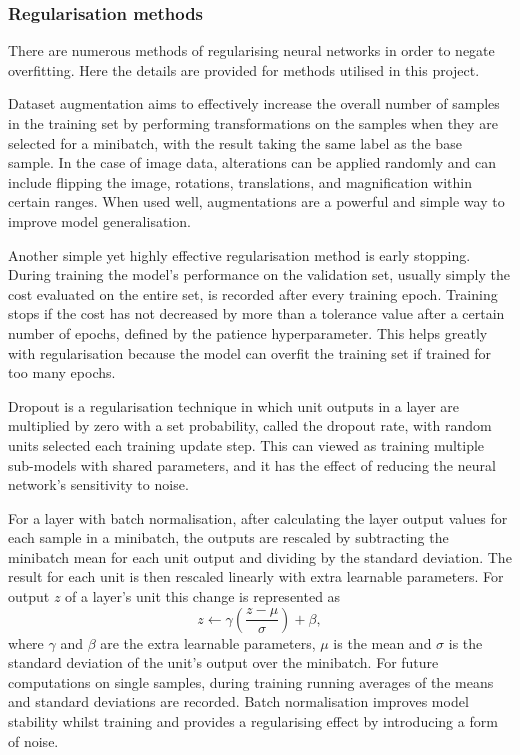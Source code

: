 \documentclass[12pt]{article}
\begin{document}
\subsubsection{Regularisation methods}
There are numerous methods of regularising neural networks in order to negate overfitting. Here the details are provided for methods utilised in this project.

Dataset augmentation aims to effectively increase the overall number of samples in the training set by performing transformations on the samples when they are selected for a minibatch, with the result taking the same label as the base sample. In the case of image data, alterations can be applied randomly and can include flipping the image, rotations, translations, and magnification within certain ranges. When used well, augmentations are a powerful and simple way to improve model generalisation.

Another simple yet highly effective regularisation method is early stopping. During training the model's performance on the validation set, usually simply the cost evaluated on the entire set, is recorded after every training epoch. Training stops if the cost has not decreased by more than a tolerance value after a certain number of epochs, defined by the patience hyperparameter. This helps greatly with regularisation because the model can overfit the training set if trained for too many epochs.

Dropout is a regularisation technique in which unit outputs in a layer are multiplied by zero with a set probability, called the dropout rate, with random units selected each training update step. This can viewed as training multiple sub-models with shared parameters, and it has the effect of reducing the neural network's sensitivity to noise.

For a layer with batch normalisation, after calculating the layer output values for each sample in a minibatch, the outputs are rescaled by subtracting the minibatch mean for each unit output and dividing by the standard deviation. The result for each unit is then rescaled linearly with extra learnable parameters. For output $z$ of a layer's unit this change is represented as
\begin{equation}
z\leftarrow\gamma\left(\frac{z-\mu}{\sigma}\right)+\beta, \label{batchnorm}
\end{equation}
where $\gamma$ and $\beta$ are the extra learnable parameters, $\mu$ is the mean and $\sigma$ is the standard deviation of the unit's output over the minibatch. For future computations on single samples, during training running averages of the means and standard deviations are recorded. Batch normalisation improves model stability whilst training and provides a regularising effect by introducing a form of noise.
\end{document}
